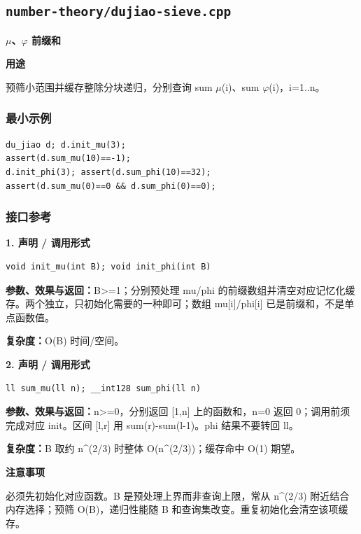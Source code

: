 \documentclass[UTF8,a4paper,10pt]{ctexart}
\newcommand{\TemplUsage}[1]{\textbf{用途}\par #1\par}
\newcommand{\TemplNote}[1]{\textbf{注意事项}\par #1\par}
\begin{document}
\subsection{\texttt{number-theory/dujiao-sieve.cpp}}
\textbf{\ensuremath{\mu}、\ensuremath{\varphi} 前缀和}\par
\TemplUsage{预筛小范围并缓存整除分块递归，分别查询 sum \ensuremath{\mu}(i)、sum \ensuremath{\varphi}(i)，i=1..n。}
\subsubsection*{最小示例}
\begin{lstlisting}
du_jiao d; d.init_mu(3);
assert(d.sum_mu(10)==-1);
d.init_phi(3); assert(d.sum_phi(10)==32);
assert(d.sum_mu(0)==0 && d.sum_phi(0)==0);
\end{lstlisting}
\subsubsection*{接口参考}
\noindent\begin{minipage}{\textwidth}
\textbf{1. 声明 / 调用形式}
\begin{lstlisting}
void init_mu(int B); void init_phi(int B)
\end{lstlisting}
\textbf{参数、效果与返回：}B>=1；分别预处理 mu/phi 的前缀数组并清空对应记忆化缓存。两个独立，只初始化需要的一种即可；数组 mu[i]/phi[i] 已是前缀和，不是单点函数值。

\textbf{复杂度：}O(B) 时间/空间。

\end{minipage}\par\vspace{0.4em}
\noindent\begin{minipage}{\textwidth}
\textbf{2. 声明 / 调用形式}
\begin{lstlisting}
ll sum_mu(ll n); __int128 sum_phi(ll n)
\end{lstlisting}
\textbf{参数、效果与返回：}n>=0，分别返回 [1,n] 上的函数和，n=0 返回 0；调用前须完成对应 init。区间 [l,r] 用 sum(r)-sum(l-1)。phi 结果不要转回 ll。

\textbf{复杂度：}B 取约 n\textasciicircum{}(2/3) 时整体 O(n\textasciicircum{}(2/3))；缓存命中 O(1) 期望。

\TemplNote{必须先初始化对应函数。B 是预处理上界而非查询上限，常从 n\textasciicircum{}(2/3) 附近结合内存选择；预筛 O(B)，递归性能随 B 和查询集改变。重复初始化会清空该项缓存。}
\end{minipage}\par\vspace{0.4em}
\clearpage
\end{document}
